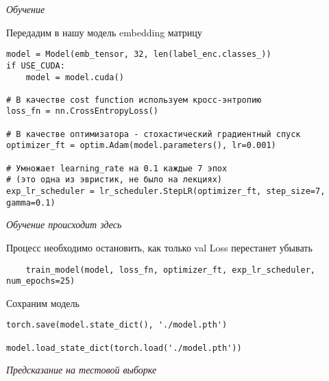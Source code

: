 \textit{Обучение}

Передадим в нашу модель embedding матрицу

\begin{verbatim}
model = Model(emb_tensor, 32, len(label_enc.classes_))
if USE_CUDA:
    model = model.cuda()

# В качестве cost function используем кросс-энтропию
loss_fn = nn.CrossEntropyLoss()

# В качестве оптимизатора - стохастический градиентный спуск
optimizer_ft = optim.Adam(model.parameters(), lr=0.001)

# Умножает learning_rate на 0.1 каждые 7 эпох 
# (это одна из эвристик, не было на лекциях)
exp_lr_scheduler = lr_scheduler.StepLR(optimizer_ft, step_size=7, gamma=0.1)
\end{verbatim}

\textit{Обучение происходит здесь}

Процесс необходимо остановить, как только val Loss перестанет убывать

\begin{verbatim}
    train_model(model, loss_fn, optimizer_ft, exp_lr_scheduler, num_epochs=25)
\end{verbatim}

Сохраним модель

\begin{verbatim}
torch.save(model.state_dict(), './model.pth')

model.load_state_dict(torch.load('./model.pth'))
\end{verbatim}

\textit{Предсказание на тестовой выборке}

